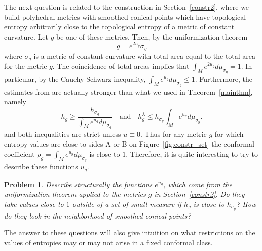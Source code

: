\documentclass[12pt]{article}
\numberwithin{equation}{section}
\newtheorem{problem}{Problem}
\theoremstyle{definition}
\begin{document}
The next question is related to the construction in Section~\ref{constr2}, where we build polyhedral metrics with smoothed conical points which have topological entropy arbitrarily close to the topological entropy of a metric of constant curvature. Let $g$ be one of these metrics. Then, by the uniformization theorem 
\begin{equation}\label{Koebe}
g = e^{2u_g}\sigma_g
\end{equation}
 where $\sigma_g$ is a metric of constant curvature with total area equal to the total area for the metric $g$. The coincidence of total areas implies that $\int_Me^{2u_g}d\mu_{\sigma_g} = 1$. In particular, by the Cauchy-Schwarz inequality, $\int_Me^{u_g}d\mu_{\sigma_g} \leqslant 1$. Furthermore, the estimates from  \cite{K82} are actually stronger  than what  we used in Theorem~\ref{mainthm}, namely  
\begin{equation*}\label{eq-conformal} 
h_g\geqslant \frac{h_{\sigma_g}}{\int_Me^{u_g}d\mu_{\sigma_g}} \quad\text{and}\quad
h^{\lambda}_g \leqslant h_{\sigma_g}\int_Me^{u_g}d\mu_{\sigma_g}.
\end{equation*}
and both inequalities are strict unless $u\equiv 0$.
 Thus for any metric $g$ for which entropy values are close to sides A or B on Figure~\ref{fig:constr_set}
 the conformal coefficient 
  $\rho_g=\int_Me^{u_g}d\mu_{\sigma_g}$ is close to $1$.  Therefore, it is quite interesting to try to describe these functions $u_g$.

\begin{problem}\label{pr4}
Describe structurally the functions $e^{u_g}$, which come from the uniformization theorem applied to the metrics $g$ in Section~\ref{constr2}. Do they take values close to $1$ outside of a set of small measure if $h_g$ is close to $h_{\sigma_g}$? How do they look in the neighborhood of smoothed conical points?
\end{problem}

The answer to these questions will also give intuition on what restrictions on the values of entropies may or may not arise in a fixed conformal class.
\end{document}
